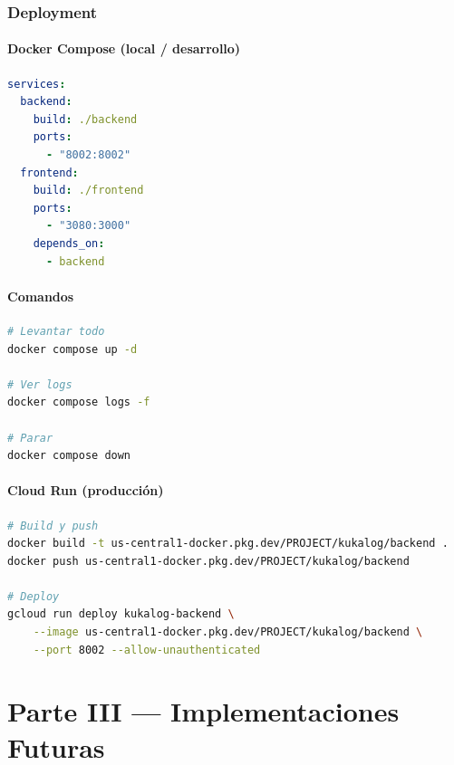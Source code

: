 \documentclass[11pt,a4paper]{article}
\begin{document}
\section{Deployment}

\subsection{Docker Compose (local / desarrollo)}

\begin{lstlisting}[language=yaml]
services:
  backend:
    build: ./backend
    ports:
      - "8002:8002"
  frontend:
    build: ./frontend
    ports:
      - "3080:3000"
    depends_on:
      - backend
\end{lstlisting}

\subsection{Comandos}

\begin{lstlisting}[language=bash]
# Levantar todo
docker compose up -d

# Ver logs
docker compose logs -f

# Parar
docker compose down
\end{lstlisting}

\subsection{Cloud Run (producción)}

\begin{lstlisting}[language=bash]
# Build y push
docker build -t us-central1-docker.pkg.dev/PROJECT/kukalog/backend .
docker push us-central1-docker.pkg.dev/PROJECT/kukalog/backend

# Deploy
gcloud run deploy kukalog-backend \
    --image us-central1-docker.pkg.dev/PROJECT/kukalog/backend \
    --port 8002 --allow-unauthenticated
\end{lstlisting}

\newpage


\part*{Parte III --- Implementaciones Futuras}
\end{document}
